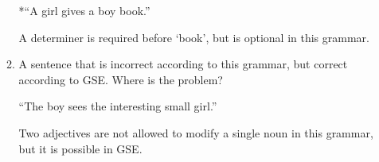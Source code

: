\documentclass{article}
\begin{document}
\begin{enumerate}
\begin{enumerate}
				*``A girl gives a boy book.''

				A determiner is required before `book', but is optional in this
				grammar.
			\item{A sentence that is incorrect according to this grammar, but
				correct according to GSE. Where is the problem?}
			
				``The boy sees the interesting small girl.''

				Two adjectives are not allowed to modify a single noun in this
				grammar, but it is possible in GSE.
		\end{enumerate}


\end{enumerate}
\end{document}
